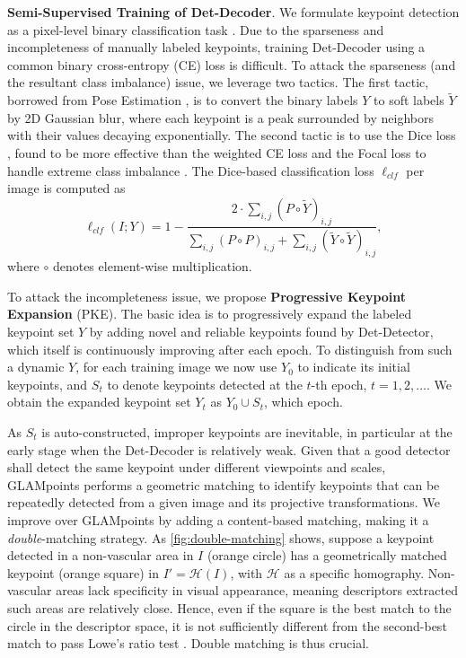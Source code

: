 \textbf{Semi-Supervised Training of Det-Decoder}.
We formulate keypoint detection as a pixel-level binary classification task \cite{detone2018superpoint, truong2019glampoints}. Due to the sparseness and incompleteness of manually labeled keypoints,  training Det-Decoder using a common binary cross-entropy (CE) loss is difficult. To attack the sparseness (and the resultant class imbalance) issue, we leverage two tactics. The first tactic, borrowed from Pose Estimation \cite{wei2016convolutional}, is to convert the binary labels $Y$ to soft labels $\tilde{Y}$ by 2D Gaussian blur, where each keypoint is a peak surrounded by neighbors with their values decaying exponentially. The second tactic is to use the Dice loss \cite{milletari2016v}, found to be  more effective than the weighted CE loss and the Focal loss to handle extreme class imbalance \cite{icpr20-lesion-net}. The Dice-based classification loss $\ell_{clf}$ per image is computed as 
\begin{equation} \label{eq:clfloss}
\ell_{clf}(I; Y)=1 - \frac{2 \cdot \sum_{i,j} {(P  \circ \tilde{Y})_{i,j}}}{\sum_{i,j}{ (P \circ P)_{i,j}}+\sum_{i,j}{(\tilde{Y} \circ \tilde{Y})_{i,j}}},
\end{equation}
where $\circ$ denotes element-wise multiplication.

To attack the incompleteness issue, we propose \textbf{Progressive Keypoint Expansion} (PKE). The basic idea is to progressively expand the labeled keypoint set $Y$ by adding novel and reliable keypoints found by  Det-Detector, which itself is continuously improving after each epoch. To distinguish from such a dynamic $Y$, for each training image we now use $Y_0$ to indicate its initial keypoints, and $S_t$ to denote keypoints detected at the $t$-th epoch, $t=1, 2, \ldots$. We obtain the expanded keypoint set $Y_t$ as $Y_0 \cup S_t$, which  epoch. 

As $S_t$ is auto-constructed, improper keypoints are inevitable, in particular at the early stage when the Det-Decoder is relatively weak. Given that a good detector shall detect the same keypoint under different viewpoints and scales, GLAMpoints performs a geometric matching to identify keypoints that can be repeatedly detected from a given image and its projective transformations. We improve over GLAMpoints by adding a content-based matching, making it a \emph{double}-matching strategy. As \cref{fig:double-matching} shows, suppose a keypoint detected in a non-vascular area in $I$ (orange circle) has a geometrically matched keypoint (orange square) in $I'=\mathcal{H}(I)$, with $\mathcal{H}$ as a specific homography. Non-vascular areas lack specificity in visual appearance, meaning descriptors extracted such areas are relatively close. Hence, even if the square is the best match to the circle in the descriptor space, it is not sufficiently different from the second-best match to pass Lowe's ratio test \cite{lowe2004distinctive}. Double matching is thus crucial. 

